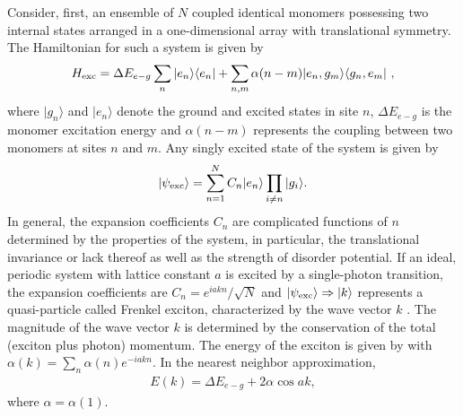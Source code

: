 Consider, first, an ensemble of ${N}$ coupled identical monomers
possessing two internal states arranged in a one-dimensional array
with translational symmetry. The Hamiltonian for such a system is
given by
\begin{equation}
H_{\rm{exc}} = \Delta E_{e-g}\sum_n | e_n \rangle \langle e_n | +
\sum_{n,m} \alpha(n-m) |e_n, g_m\rangle \langle g_n, e_m | \ ,
\label{ham}
\end{equation}
where  $|g_n \rangle$ and $|e_n\rangle$ denote the ground and
excited states in site $n$, $\Delta E_{e-g}$ is the monomer
excitation energy and $\alpha(n-m)$ represents the coupling
between two monomers at sites $n$ and $m$. 
Any singly excited state of the system is given by
%
\begin{eqnarray}
|\psi_{\rm exc}\rangle = \sum_{n=1}^N C_n |e_n\rangle \prod_{i
\neq n} |g_i\rangle . \label{basis}
\end{eqnarray}
%
In general, the expansion coefficients $C_n$ are complicated functions of $n$ determined by the properties of the system, in particular, the translational invariance or lack thereof as well as the strength of disorder potential. 
 If an ideal, periodic system with lattice constant $a$ is excited by a single-photon transition, 
the expansion coefficients are  $C_n =
e^{iakn}/\sqrt{N}$ and  $|\psi_{\rm exc} \rangle \Rightarrow
|k\rangle$ represents a quasi-particle called
Frenkel exciton, characterized by the wave vector $k$
\cite{agranovich}. The magnitude of the wave vector $k$ is determined by the conservation of the total (exciton plus photon) momentum. 
The energy of the exciton is given by 
 with $\alpha(k) =\sum_n \alpha(n)
e^{-i  a k n}$. In the nearest neighbor approximation,
\begin{eqnarray}
E(k) = \Delta E_{e-g} + 2 \alpha \cos ak, \label{dispersion}
\label{Eexc}
\end{eqnarray}
where $\alpha=\alpha(1)$. 
 
 
 


 
%

